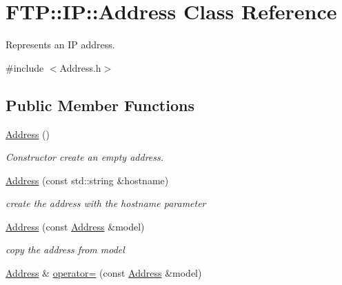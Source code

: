 \hypertarget{classFTP_1_1IP_1_1Address}{}\section{F\+T\+P\+:\+:I\+P\+:\+:Address Class Reference}
\label{classFTP_1_1IP_1_1Address}


Represents an I\+P address.  




{\ttfamily \#include $<$Address.\+h$>$}

\subsection*{Public Member Functions}
\begin{DoxyCompactItemize}
\item 
\hypertarget{classFTP_1_1IP_1_1Address_a43b4fdcaeea7feec12c8c39018a2c426}{}\hyperlink{classFTP_1_1IP_1_1Address_a43b4fdcaeea7feec12c8c39018a2c426}{Address} ()\label{classFTP_1_1IP_1_1Address_a43b4fdcaeea7feec12c8c39018a2c426}

\begin{DoxyCompactList}\small\item\em Constructor create an empty address. \end{DoxyCompactList}\item 
\hyperlink{classFTP_1_1IP_1_1Address_a6d18d47e09493c961921214e24bf5a16}{Address} (const std\+::string \&hostname)
\begin{DoxyCompactList}\small\item\em create the address with the \textquotesingle{}hostname\textquotesingle{} parameter \end{DoxyCompactList}\item 
\hypertarget{classFTP_1_1IP_1_1Address_ac22351617c160051333e8d3dbb29ca18}{}\hyperlink{classFTP_1_1IP_1_1Address_ac22351617c160051333e8d3dbb29ca18}{Address} (const \hyperlink{classFTP_1_1IP_1_1Address}{Address} \&model)\label{classFTP_1_1IP_1_1Address_ac22351617c160051333e8d3dbb29ca18}

\begin{DoxyCompactList}\small\item\em copy the address from \textquotesingle{}model\textquotesingle{} \end{DoxyCompactList}\item 
\hypertarget{classFTP_1_1IP_1_1Address_a0523601625aea2ae8b5c63d367abf1fd}{}\hyperlink{classFTP_1_1IP_1_1Address}{Address} \& \hyperlink{classFTP_1_1IP_1_1Address_a0523601625aea2ae8b5c63d367abf1fd}{operator=} (const \hyperlink{classFTP_1_1IP_1_1Address}{Address} \&model)\label{classFTP_1_1IP_1_1Address_a0523601625aea2ae8b5c63d367abf1fd}


\end{DoxyCompactItemize}
